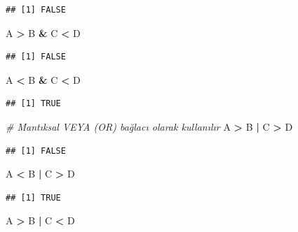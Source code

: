 \documentclass[
]{book}
\newenvironment{Shaded}{\begin{snugshade}}{\end{snugshade}}
\newcommand{\CommentTok}[1]{\textcolor[rgb]{0.56,0.35,0.01}{\textit{#1}}}
\newcommand{\NormalTok}[1]{#1}
\newcommand{\SpecialCharTok}[1]{\textcolor[rgb]{0.81,0.36,0.00}{\textbf{#1}}}
\begin{document}
\begin{verbatim}
## [1] FALSE
\end{verbatim}

\begin{Shaded}
\begin{Highlighting}[]
\NormalTok{A }\SpecialCharTok{\textgreater{}}\NormalTok{ B }\SpecialCharTok{\&}\NormalTok{ C }\SpecialCharTok{\textless{}}\NormalTok{ D}
\end{Highlighting}
\end{Shaded}

\begin{verbatim}
## [1] FALSE
\end{verbatim}

\begin{Shaded}
\begin{Highlighting}[]
\NormalTok{A }\SpecialCharTok{\textless{}}\NormalTok{ B }\SpecialCharTok{\&}\NormalTok{ C }\SpecialCharTok{\textless{}}\NormalTok{ D}
\end{Highlighting}
\end{Shaded}

\begin{verbatim}
## [1] TRUE
\end{verbatim}

\begin{Shaded}
\begin{Highlighting}[]
\CommentTok{\# Mantıksal VEYA (OR) bağlacı olarak kullanılır}
\NormalTok{A }\SpecialCharTok{\textgreater{}}\NormalTok{ B }\SpecialCharTok{|}\NormalTok{ C }\SpecialCharTok{\textgreater{}}\NormalTok{ D}
\end{Highlighting}
\end{Shaded}

\begin{verbatim}
## [1] FALSE
\end{verbatim}

\begin{Shaded}
\begin{Highlighting}[]
\NormalTok{A }\SpecialCharTok{\textless{}}\NormalTok{ B }\SpecialCharTok{|}\NormalTok{ C }\SpecialCharTok{\textgreater{}}\NormalTok{ D}
\end{Highlighting}
\end{Shaded}

\begin{verbatim}
## [1] TRUE
\end{verbatim}

\begin{Shaded}
\begin{Highlighting}[]
\NormalTok{A }\SpecialCharTok{\textgreater{}}\NormalTok{ B }\SpecialCharTok{|}\NormalTok{ C }\SpecialCharTok{\textless{}}\NormalTok{ D}
\end{Highlighting}
\end{Shaded}
\end{document}
